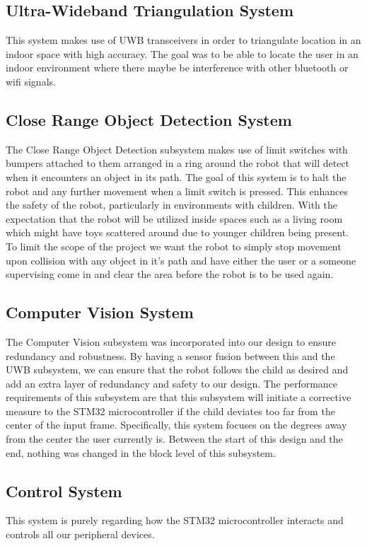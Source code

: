 \documentclass{report}
\begin{document}
    \subsection{Ultra-Wideband Triangulation System}
    This system makes use of UWB transceivers in order to triangulate location in an indoor space with high accuracy. The goal was to be able to locate the user in an indoor environment where there maybe be interference with other bluetooth or wifi signals. 
    
    \subsection{Close Range Object Detection System}
    The Close Range Object Detection subsystem makes use of limit switches with bumpers attached to them arranged in a ring around the robot that will detect when it encounters an object in its path. The goal of this system is to halt the robot and any further movement when a limit switch is pressed. This enhances the safety of the robot, particularly in environments with children. With the expectation that the robot will be utilized inside spaces such as a living room which might have toys scattered around due to younger children being present. To limit the scope of the project we want the robot to simply stop movement upon collision with any object in it's path and have either the user or a someone supervising come in and clear the area before the robot is to be used again.
    
    \subsection{Computer Vision System}
    The Computer Vision subsystem was incorporated into our design to ensure redundancy and robustness. By having a sensor fusion between this and the UWB subsystem, we can ensure that the robot follows the child as desired and add an extra layer of redundancy and safety to our design. The performance requirements of this subsystem are that this subsystem will initiate a corrective measure to the STM32 microcontroller if the child deviates too far from the center of the input frame. Specifically, this system focuses on the degrees away from the center the user currently is. Between the start of this design and the end, nothing was changed in the block level of this subsystem.
    
    \subsection{Control System}
    This system is purely regarding how the STM32 microcontroller interacts and controls all our peripheral devices.
    
\end{document}
